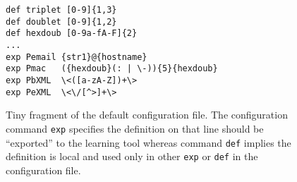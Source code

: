 


\begin{figure}
\begin{verbatim}
def triplet [0-9]{1,3}
def doublet [0-9]{1,2}
def hexdoub [0-9a-fA-F]{2}
...
exp Pemail {str1}@{hostname}
exp Pmac   ({hexdoub}(: | \-)){5}{hexdoub}
exp PbXML  \<([a-zA-Z])+\>
exp PeXML  \<\/[^>]+\>
\end{verbatim}
\caption{Tiny fragment of the default configuration file. 
The configuration command {\tt exp} specifies the definition on that
line should be  ``exported'' to
the learning tool whereas command {\tt def} implies the definition
is local and used only in other {\tt exp} or {\tt def} in the
configuration file.}
\label {fig:configfile}
\end{figure}






